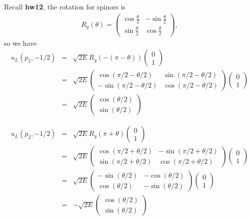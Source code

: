 \documentclass[11pt]{article}
\def\th{\theta}
\begin{document}
\section{ }
Recall {\bf hw12}, the rotation for spinors is
\begin{eqnarray}
    R_y(\theta)=
    \begin{pmatrix}
        \cos \frac{\theta}{2} & -\sin \frac{\theta}{2} \\
        \sin \frac{\theta}{2} & \cos \frac{\theta}{2}
    \end{pmatrix},
\end{eqnarray}
so we have
\begin{eqnarray}
    u_L(p_2,-1/2)
    &=& \sqrt{2E} R_y(-(\pi-\theta)) 
    \begin{pmatrix}
    0 \\ 1
    \end{pmatrix}\\
    &=& \sqrt{2E}
    \begin{pmatrix}
        \cos(\pi/2-\th/2) & \sin(\pi/2-\th/2) \\
        -\sin(\pi/2-\th/2) &  \cos(\pi/2-\th/2)
    \end{pmatrix}
    \begin{pmatrix}
        0 \\ 1
    \end{pmatrix} \\
    &=& \sqrt{2E} 
    \begin{pmatrix}
        \cos(\theta/2) \\ \sin(\theta/2)
    \end{pmatrix} 
\end{eqnarray}

\begin{eqnarray}
    u_L(p_2,-1/2)
    &=& \sqrt{2E} R_y(\pi+\theta) 
    \begin{pmatrix}
    0 \\ 1
    \end{pmatrix}\\
    &=& \sqrt{2E}
    \begin{pmatrix}
        \cos(\pi/2+\th/2) & -\sin(\pi/2+\th/2) \\
        \sin(\pi/2+\th/2) &  \cos(\pi/2+\th/2)
    \end{pmatrix}
    \begin{pmatrix}
        0 \\ 1
    \end{pmatrix} \\
    &=& 
    \sqrt{2E}
    \begin{pmatrix}
        -\sin(\th/2) & -\cos(\th/2) \\
        \cos(\th/2) &  -\sin(\th/2)
    \end{pmatrix}
    \begin{pmatrix}
        0 \\ 1
    \end{pmatrix}\\
    &=&
    -\sqrt{2E} 
    \begin{pmatrix}
       \cos(\theta/2) \\ \sin(\theta/2)
    \end{pmatrix} 
\end{eqnarray}
\end{document}
